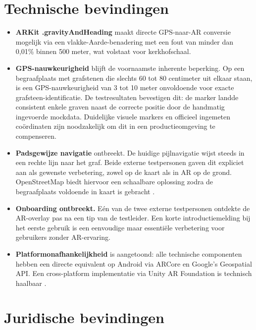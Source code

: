 \section{Technische bevindingen}

\begin{itemize}
    \item \textbf{ARKit .gravityAndHeading} maakt directe GPS-naar-AR conversie
    mogelijk via een vlakke-Aarde-benadering met een fout van minder dan 0,01\%
    binnen 500 meter, wat volstaat voor kerkhofschaal.
    
    \item \textbf{GPS-nauwkeurigheid} blijft de voornaamste inherente beperking.
    Op een begraafplaats met grafstenen die slechts 60 tot 80 centimeter uit
    elkaar staan, is een GPS-nauwkeurigheid van 3 tot 10 meter onvoldoende voor
    exacte grafsteen-identificatie. De testresultaten bevestigen dit: de marker
    landde consistent enkele graven naast de correcte positie door de handmatig
    ingevoerde mockdata. Duidelijke visuele markers en officieel ingemeten
    coördinaten zijn noodzakelijk om dit in een productieomgeving te compenseren.
    
    \item \textbf{Padsgewijze navigatie} ontbreekt. De huidige pijlnavigatie
    wijst steeds in een rechte lijn naar het graf. Beide externe testpersonen
    gaven dit expliciet aan als gewenste verbetering, zowel op de kaart als
    in AR op de grond. OpenStreetMap biedt hiervoor een schaalbare oplossing
    zodra de begraafplaats voldoende in kaart is gebracht \autocite{Novack2018}.
    
    \item \textbf{Onboarding ontbreekt.} Eén van de twee externe testpersonen
    ontdekte de AR-overlay pas na een tip van de testleider. Een korte
    introductiemelding bij het eerste gebruik is een eenvoudige maar essentiële
    verbetering voor gebruikers zonder AR-ervaring.
    
    \item \textbf{Platformonafhankelijkheid} is aangetoond: alle technische
    componenten hebben een directe equivalent op Android via ARCore en Google's
    Geospatial API. Een cross-platform implementatie via Unity AR Foundation
    is technisch haalbaar \autocite{GoogleARCore2024}.
\end{itemize}

\section{Juridische bevindingen}

